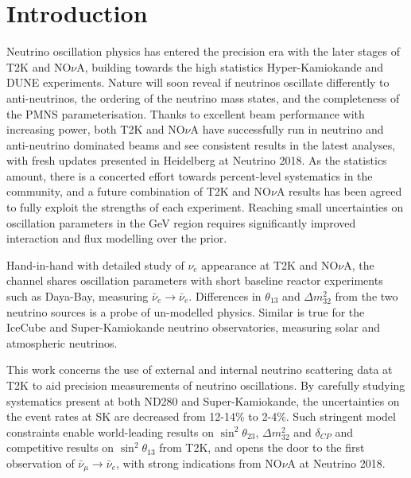 \chapter{Introduction}
\label{chap:intro}
Neutrino oscillation physics has entered the precision era with the later stages of T2K\cite{t2k_2017} and NO$\nu$A\cite{nova_2018}, building towards the high statistics Hyper-Kamiokande\cite{hyperk} and DUNE\cite{dune} experiments. Nature will soon reveal if neutrinos oscillate differently to anti-neutrinos, the ordering of the neutrino mass states, and the completeness of the PMNS parameterisation\cite{p1,p2,mns}. Thanks to excellent beam performance with increasing power, both T2K and NO$\nu$A have successfully run in neutrino and anti-neutrino dominated beams and see consistent results in the latest analyses, with fresh updates presented in Heidelberg at Neutrino 2018\cite{t2k_neutrino2018, nova_neutrino2018}. As the statistics amount, there is a concerted effort towards percent-level systematics in the community, and a future combination of T2K and NO$\nu$A results has been agreed\cite{t2k_nova, t2k_nova_meet} to fully exploit the strengths of each experiment. Reaching small uncertainties on oscillation parameters in the GeV region requires significantly improved interaction and flux modelling over the prior\cite{t2k_ii, dune_exp}.

Hand-in-hand with detailed study of $\nu_e$ appearance at T2K and NO$\nu$A, the channel shares oscillation parameters with short baseline reactor experiments such as Daya-Bay\cite{daya_bay}, measuring $\bar{\nu}_e\rightarrow \bar{\nu}_e$. Differences in $\theta_{13}$ and $\Delta m^2_{32}$ from the two neutrino sources is a probe of un-modelled physics. Similar is true for the IceCube\cite{icecube} and Super-Kamiokande\cite{superk} neutrino observatories, measuring solar and atmospheric neutrinos.

This work concerns the use of external and internal neutrino scattering data at T2K to aid precision measurements of neutrino oscillations. By carefully studying systematics present at both ND280 and Super-Kamiokande, the uncertainties on the event rates at SK are decreased from 12-14\% to 2-4\%. Such stringent model constraints enable world-leading results on $\sin^2\theta_{23}$, $\Delta m^2_{32}$ and $\delta_{CP}$ and competitive results on $\sin^2\theta_{13}$ from T2K\cite{pdg_2017}, and opens the door to the first observation of $\bar{\nu}_\mu \rightarrow \bar{\nu}_e$, with strong indications from NO$\nu$A at Neutrino 2018\cite{nova_neutrino2018}.

